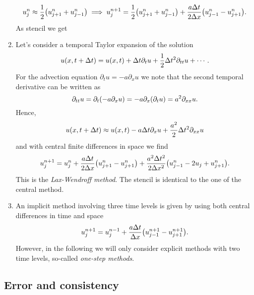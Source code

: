 \begin{enumerate}
	\[
		u_j^n \approx \frac{1}{2}\parentheses*{u_{j + 1}^n + u_{j - 1}^n} \implies u_j^{n + 1} = \frac{1}{2}\parentheses*{u_{j + 1}^n + u_{j - 1}^n} + \frac{a\Delta t}{2\Delta x}\parentheses*{u_{j - 1}^n - u_{j + 1}^n}.
	\]
	As stencil we get
	\begin{center}
	\end{center}
	\item Let's consider a temporal Taylor expansion of the solution
	\[
		u\parentheses*{x, t + \Delta t} = u\parentheses*{x, t} + \Delta t\partial_t u + \frac{1}{2}\Delta t^2 \partial_{tt}u + \cdots.
	\]
	For the advection equation \(\partial_t u = -a\partial_x u\) we note that the second temporal derivative can be written as
	\[
		\partial_{tt}u = \partial_t \parentheses*{-a\partial_x u} = -a\partial_x \parentheses*{\partial_t u} = a^2 \partial_{xx}u.
	\]
	Hence,
	\[
		u\parentheses*{x, t + \Delta t} \approx u\parentheses*{x, t} - a\Delta t\partial_x u + \frac{a^2}{2}\Delta t^2 \partial_{xx}u
	\]
	and with central finite differences in space we find
	\[
		u_j^{n + 1} = u_j^n + \frac{a\Delta t}{2\Delta x}\parentheses*{u_{j + 1}^n - u_{j + 1}^n} + \frac{a^2 \Delta t^2}{2\Delta x^2}\parentheses*{u_{j - 1}^n - 2u_j + u_{j + 1}^n}.
	\]
	This is the \emph{Lax-Wendroff method}. The stencil is identical to the one of the central method.
	\item An implicit method involving three time levels is given by using both central differences in time and space
	\[
		u_j^{n + 1} = u_j^{n - 1} + \frac{a\Delta t}{\Delta x}\parentheses*{u_{j - 1}^{n + 1} - u_{j + 1}^{n + 1}}.
	\]
	However, in the following we will only consider explicit methods with two time levels, so-called \emph{one-step methods}.
\end{enumerate}
	

\subsection{Error and consistency}

